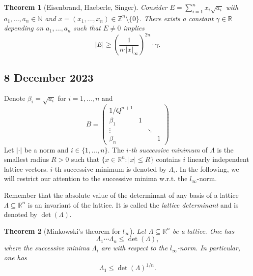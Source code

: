 \documentclass[a4paper,11pt,american]{article}
\newcommand{\N}{\mathbb{N}}
\newcommand{\R}{\mathbb{R}}
\newcommand{\Z}{\mathbb{Z}}
\theoremstyle{plain}
\newtheorem{theorem}{Theorem}
\theoremstyle{definition}
\begin{document}
 \begin{theorem}[Eisenbrand, Haeberle, Singer]
  \label{thr:6}
  Consider $ E = \sum_{i=1}^n x_i \sqrt{a_i}$ with  
  $a_1,\dots,a_n\in \N$  and  $x = (x_1,\dots,x_n)\in\Z^n\setminus\{0\}$. There exists a constant $\gamma \in \R$ depending on $a_1,\dots,a_n$ such that $E \neq0$ implies
  \begin{equation}
    \label{eq:12}
    \vert E\vert  \geq  \left( \frac{1}{n \cdot \vert x\vert _\infty}\right)^{2n} \cdot \gamma. 
  \end{equation}
\end{theorem}

\subsection{8 December 2023}
Denote $\beta_i = \sqrt{a_i}$ for $i=1,\dots,n$ and 
 $$ B = 
   \begin{pmatrix}
     1/Q^{n+1} &  &  &   \\
     \beta_1      &  1            &        &   \\
     \vdots     &               & \ddots & \\
     \beta_n    &               &        & 1
   \end{pmatrix}
$$
 Let $\vert  \cdot\vert $ be a norm and $i \in \{1,\dots,n\}$. The \emph{$i$-th successive minimum} of $\Lambda$  is the smallest radius $R>0$ such that $\{ x \in \R^n : \vert x\vert \leq R\}$ contains $i$ linearly independent lattice vectors.  $i$-th successive minimum is denoted by $\Lambda_i$. In the following, we will restrict our attention to the successive minima w.r.t. the $l_\infty$-norm.

 Remember that the absolute value of the determinant of any basis of a lattice $\Lambda \subseteq \R^n$ is an invariant of the lattice. It is called the \emph{lattice determinant} and is denoted by $\det(\Lambda)$.

\begin{theorem}[Minkowski's theorem for $l_\infty$]
  \label{thr:2}
  Let $\Lambda \subseteq \R^n$ be a lattice. One has
  \begin{equation}
    \label{eq:7}
    \Lambda_1 \cdots \Lambda_n \leq \det(\Lambda), 
  \end{equation}
  where the successive minima $\Lambda_i$ are with respect to the $l_\infty$-norm. 
  In particular, one has
  \begin{displaymath}
    \Lambda_1 \leq \det(\Lambda)^{1/n}. 
  \end{displaymath}
\end{theorem}
\end{document}

